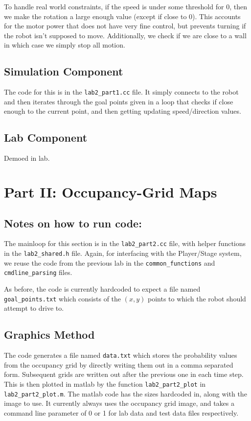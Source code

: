 \documentclass[10pt, titlepage, onecolumn, fleqn]{article}
\begin{document}
To handle real world constraints, if the speed is under some threshold for 0, then we make the rotation a large enough value (except if close to 0). This accounts for the motor power that does not have very fine control, but prevents turning if the robot isn't supposed to move. Additionally, we check if we are close to a wall in which case we simply stop all motion.

\subsection{Simulation Component}

The code for this is in the \verb|lab2_part1.cc| file. It simply connects to the robot and then iterates through the goal points given in a loop that checks if close enough to the current point, and then getting updating speed/direction values.

\subsection{Lab Component}

Demoed in lab.

\section{Part II: Occupancy-Grid Maps}

\subsection*{Notes on how to run code:}

The mainloop for this section is in the \verb|lab2_part2.cc| file, with helper functions in the \verb|lab2_shared.h| file. Again, for interfacing with the Player/Stage system, we reuse the code from the previous lab in the \verb|common_functions| and \verb|cmdline_parsing| files.

As before, the code is currently hardcoded to expect a file named \verb|goal_points.txt| which consists of the $(x,y)$ points to which the robot should attempt to drive to.

\subsection*{Graphics Method}

The code generates a file named \verb|data.txt| which stores the probability values from the occupancy grid by directly writing them out in a comma separated form. Subsequent grids are written out after the previous one in each time step. This is then plotted in matlab by the function \verb|lab2_part2_plot| in \verb|lab2_part2_plot.m|. The matlab code has the sizes hardcoded in, along with the image to use. It currently always uses the occupancy grid image, and takes a command line parameter of 0 or 1 for lab data and test data files respectively.
\end{document}
